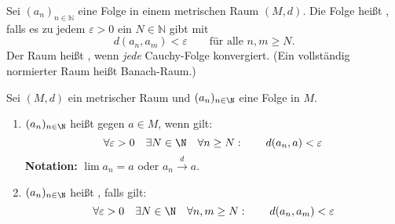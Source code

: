 Sei $(a_n)_{n \in \mathbb{N}}$ eine Folge in einem metrischen Raum $(M, d)$. Die Folge heißt , falls es zu jedem $\varepsilon > 0$ ein $N \in \mathbb{N}$ gibt mit 
$$d(a_n, a_m) < \varepsilon \qquad \text{für alle $n, m \geq N$.}$$
Der Raum heißt , wenn \textit{jede} Cauchy-Folge konvergiert. (Ein vollständig normierter Raum heißt Banach-Raum.)

Sei $(M, d)$ ein metrischer Raum und $(a_n)_{n \in \N}$ eine Folge in $M$.
\begin{enumerate}
    \item $(a_n)_{n \in \N}$ heißt  gegen $a \in M$, wenn gilt:
    $$\forall \varepsilon > 0 \quad \exists N \in \N \quad \forall n \geq N : \qquad d(a_n, a) < \varepsilon$$
    \textbf{Notation:} $\lim a_n = a$ oder $a_n \xrightarrow{d} a$.
    \item $(a_n)_{n \in \N}$ heißt , falls gilt:
    $$\forall \varepsilon > 0 \quad \exists N \in \N \quad \forall n, m \geq N : \qquad d(a_n, a_m) < \varepsilon$$
\end{enumerate}